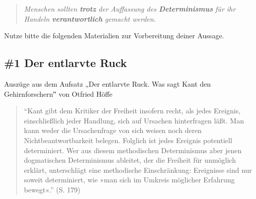 \documentclass[
  a4paper,
]{report}
\begin{document}
\begin{quote}
\emph{Menschen sollten \textbf{trotz} der Auffassung des \textbf{Determinismus} für ihr Handeln \textbf{verantwortlich} gemacht werden.}
\end{quote}

Nutze bitte die folgenden Materialien zur Vorbereitung deiner Aussage.

\hypertarget{pr-expert-ev1}{%
\subsection{\#1 Der entlarvte Ruck}\label{pr-expert-ev1}}

Auszüge aus dem Aufsatz „Der entlarvte Ruck. Was sagt Kant den Gehirnforschern‟ von Otfried Höffe \citeyearpar{Höffe2004}

\begin{quote}
``Kant gibt dem Kritiker der Freiheit insofern recht, als jedes Ereignis, einschließlich jeder Handlung, sich auf Ursachen hinterfragen läßt. Man kann weder die Ursachenfrage von sich weisen noch deren Nichtbeantwortbarkeit belegen. Folglich ist jedes Ereignis potentiell determiniert. Wer aus diesem methodischen Determinismus aber jenen dogmatischen Determinismus ableitet, der die Freiheit für unmöglich erklärt, unterschlägt eine methodische Einschränkung: Ereignisse sind nur soweit determiniert, wie »man sich im Umkreis möglicher Erfahrung bewegt«.'' (S. 179)
\end{quote}
\end{document}
